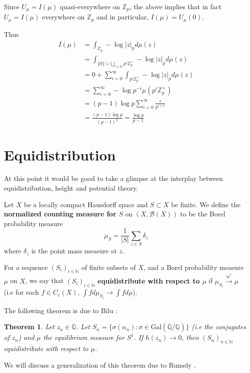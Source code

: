 \documentclass{amsart}
\newtheorem{thm}{Theorem}[section]
\newcommand{\N}{\mathbb{N}}
\newcommand{\Z}{\mathbb{Z}}
\newcommand{\Q}{\mathbb{Q}}
\newcommand{\MCB}{\mathcal{B}}
\newcommand{\ol}{\overline}
\begin{document}
Since $U_{\mu} = I(\mu)$ quasi-everywhere on $\Z_p$, the above implies that in fact $U_{\mu} = I(\mu)$ everywhere on $\Z_p$ and in particular, $I(\mu) = U_{\mu}(0)$.

Thus 
\begin{align*}
I(\mu) 
&= \int_{\Z_p}-\log|z|_pd\mu(z)\\
&= \int_{\{0\}\cup \bigcup\limits_{i \in \N}p^i\Z_p^{\times}}-\log|z|_pd\mu(z)\\
&= 0+ \sum_{i=0}^{\infty} \int_{p^i\Z_p^{\times}}-\log|z|_p d\mu(z)\\
&= \sum_{i=0}^{\infty}-\log p^{-i} \mu(p^i\Z_p^{\times})\\
&= (p-1)\log p \sum_{i=0}^{\infty}\frac{i}{p^{i+1}}\\
&= \frac{(p-1)  \log p}{(p-1)^2} = \frac{\log p}{p-1} 
\end{align*}  

\section{Equidistribution}

At this point it would be good to take a glimpse at the interplay between equidistribution, height and potential theory. 

Let $X$ be a locally compact Hausdorff space and $S \subset X $ be finite. We define the \textbf{normalized counting measure for $S$} on $(X, \MCB(X))$ to be the Borel probability measure $$\mu_S = \frac{1}{|S|}\sum\limits_{z \in S} \delta_z$$ where $\delta_z$ is the point mass measure at $z$. \

For a sequence $(S_i)_{i \in \N}$ of finite subsets of $X$, and a Borel probability measure $\mu$ on $X$, we say that $(S_i)_{i \in \N}$   \textbf{equidistribute with respect to $\mu$} if $\mu_{S_i} \xrightarrow{w^*} \mu$ (i.e for each $f \in C_c(X)$, $\int f d\mu_{S_i} \rightarrow \int f d\mu$).

The following theorem is due to Bilu \cite{Bilu}:

\begin{thm}

Let $z_n \in \overline{\Q}$. Let $S_n = \{\sigma(\alpha_n): \sigma \in \mathrm{Gal}(\ol{ \Q }/ \Q )\}$ (i.e the conjugates of $z_n$) and $\mu$ the equilibrium measure for $S^1$. If $h(z_n) \rightarrow 0$, then $(S_n)_{n \in \N}$ equidistribute with respect to $\mu$.  

\end{thm}
 
We will discuss a generalization of this theorem due to Rumely \cite{R}. 
\end{document}

